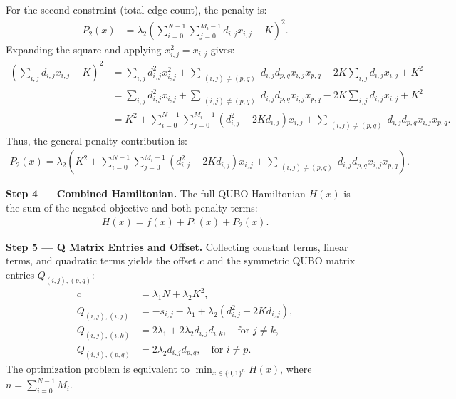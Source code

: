 \documentclass[12pt]{article}
\begin{document}
For the second constraint (total edge count), the penalty is:
\begin{align}
    P_2(x) &= \lambda_2 \left( \sum_{i=0}^{N-1} \sum_{j=0}^{M_i-1} d_{i,j} x_{i,j} - K \right)^2.
\end{align}
Expanding the square and applying $x_{i,j}^2 = x_{i,j}$ gives:
\begin{align}
    \left( \sum_{i,j} d_{i,j} x_{i,j} - K \right)^2 &= \sum_{i,j} d_{i,j}^2 x_{i,j}^2 + \sum_{\substack{(i,j) \neq (p,q)}} d_{i,j} d_{p,q} x_{i,j} x_{p,q} - 2K \sum_{i,j} d_{i,j} x_{i,j} + K^2 \nonumber \\
    &= \sum_{i,j} d_{i,j}^2 x_{i,j} + \sum_{\substack{(i,j) \neq (p,q)}} d_{i,j} d_{p,q} x_{i,j} x_{p,q} - 2K \sum_{i,j} d_{i,j} x_{i,j} + K^2 \nonumber \\
    &= K^2 + \sum_{i=0}^{N-1} \sum_{j=0}^{M_i-1} (d_{i,j}^2 - 2K d_{i,j}) x_{i,j} + \sum_{\substack{(i,j) \neq (p,q)}} d_{i,j} d_{p,q} x_{i,j} x_{p,q}.
\end{align}
Thus, the general penalty contribution is:
\begin{align}
    P_2(x) = \lambda_2 \left( K^2 + \sum_{i=0}^{N-1} \sum_{j=0}^{M_i-1} (d_{i,j}^2 - 2K d_{i,j}) x_{i,j} + \sum_{\substack{(i,j) \neq (p,q)}} d_{i,j} d_{p,q} x_{i,j} x_{p,q} \right).
\end{align}

\textbf{Step 4 --- Combined Hamiltonian.} The full QUBO Hamiltonian $H(x)$ is the sum of the negated objective and both penalty terms:
\begin{align}
    H(x) = f(x) + P_1(x) + P_2(x).
\end{align}

\textbf{Step 5 --- Q Matrix Entries and Offset.} Collecting constant terms, linear terms, and quadratic terms yields the offset $c$ and the symmetric QUBO matrix entries $Q_{(i,j),(p,q)}$:
\begin{align}
    c &= \lambda_1 N + \lambda_2 K^2, \\
    Q_{(i,j),(i,j)} &= -s_{i,j} - \lambda_1 + \lambda_2(d_{i,j}^2 - 2K d_{i,j}), \\
    Q_{(i,j),(i,k)} &= 2\lambda_1 + 2\lambda_2 d_{i,j} d_{i,k}, \quad \text{for } j \neq k, \\
    Q_{(i,j),(p,q)} &= 2\lambda_2 d_{i,j} d_{p,q}, \quad \text{for } i \neq p.
\end{align}
The optimization problem is equivalent to $\min_{x \in \{0,1\}^n} H(x)$, where $n = \sum_{i=0}^{N-1} M_i$.
\end{document}
